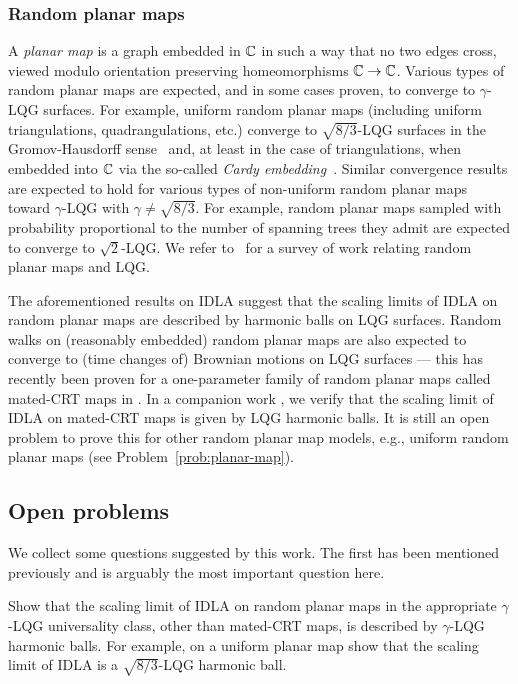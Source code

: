 \documentclass[12pt]{amsart}
\numberwithin{equation}{section}
\begin{document}
	\subsubsection{Random planar maps}
	A \textit{planar map} is a graph embedded in $\mathbb{C}$ in such a way that no two edges cross, viewed modulo orientation preserving homeomorphisms $\mathbb{C} \rightarrow \mathbb{C}$. 
	Various types of random planar maps are expected, and in some cases proven, to converge to $\gamma$-LQG surfaces. For example, uniform random planar maps (including uniform triangulations, quadrangulations, etc.) converge to $\sqrt{8/3}$-LQG surfaces in the Gromov-Hausdorff sense~\cite{legall-uniqueness,miermont-brownian-map,lqg-tbm1,lqg-tbm2} and, at least in the case of triangulations, when embedded into $\mathbb{C}$ via the so-called \textit{Cardy embedding}~\cite{hs-cardy-embedding}. Similar convergence results are expected to hold for various types of non-uniform random planar maps toward $\gamma$-LQG with $\gamma\not=\sqrt{8/3}$. For example, random planar maps sampled with probability proportional to the number of spanning trees they admit are expected to converge to $\sqrt 2$-LQG. We refer to~\cite{ghs-mating-survey} for a survey of work relating random planar maps and LQG. 
	
	
	The aforementioned results on IDLA suggest that the scaling limits of IDLA on random planar maps are described by harmonic balls on LQG surfaces. 
	Random walks on (reasonably embedded) random planar maps are also expected to converge to (time changes of) Brownian motions on LQG surfaces
	--- this has recently been proven for a one-parameter family of random planar maps called mated-CRT maps in \cite{gms-tutte,berestycki2020random}.   
	In a companion work \cite{bou2022idla}, we verify that the scaling limit of IDLA on mated-CRT maps is given by LQG harmonic balls. It is still an open problem to prove this for other random planar map models, e.g., uniform random planar maps (see Problem~\ref{prob:planar-map}). 
	
	
	\subsection{Open problems} \label{subsec:open-problems}
	We collect some questions suggested by this work. The first has been mentioned previously
	and is arguably the most important question here. 
	\begin{problem} \label{prob:planar-map}
		Show that the scaling limit of IDLA on random planar maps in the appropriate $\gamma$-LQG universality class, other than mated-CRT maps, is described by $\gamma$-LQG harmonic balls.
		For example, on a uniform planar map show that the scaling limit of IDLA is a $\sqrt{8/3}$-LQG harmonic ball.
	\end{problem}
	
\end{document}
